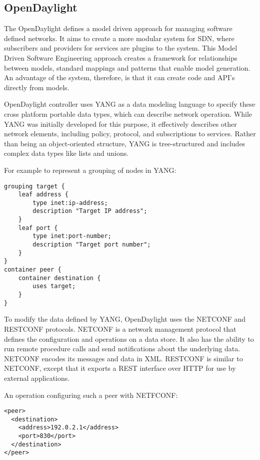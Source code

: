 \documentclass[letterpaper,twocolumn,10pt]{article}
\begin{document}


% 
% 
\subsection{OpenDaylight}

The OpenDaylight defines a model driven approach for managing software defined networks. It aims to create a more modular system for SDN, where subscribers and providers for services are plugins to the system. This Model Driven Software Engineering approach creates a framework for relationships between models, standard mappings and patterns that enable model generation. An advantage of the system, therefore, is that it can create code and API's directly from models.\cite{ODL}

OpenDaylight controller uses YANG as a data modeling language to specify these cross platform portable data types, which can describe network operation. While YANG was initially developed for this purpose, it effectively describes other network elements, including policy, protocol, and subscriptions to services. Rather than being an object-oriented structure, YANG is tree-structured and includes complex data types like lists and unions.\cite{yang}

For example to represent a grouping of nodes in YANG:\cite{yang}
\begin{lstlisting}
grouping target {
    leaf address {
        type inet:ip-address;
        description "Target IP address";
    }
    leaf port {
        type inet:port-number;
        description "Target port number";
    }
}
container peer {
    container destination {
        uses target;
    }
}
\end{lstlisting}

To modify the data defined by YANG, OpenDaylight uses the NETCONF and RESTCONF protocols. NETCONF is a network management protocol that defines the configuration and operations on a data store. It also has the ability to run remote procedure calls and send notifications about the underlying data. NETCONF encodes its messages and data in XML. RESTCONF is similar to NETCONF, except that it exports a REST interface over HTTP for use by external applications.\cite{enns2011netconf}

An operation configuring such a peer with NETFCONF:\cite{yang}
\begin{lstlisting}
<peer>
  <destination>
    <address>192.0.2.1</address>
    <port>830</port>
  </destination>
</peer>
\end{lstlisting}
\end{document}
